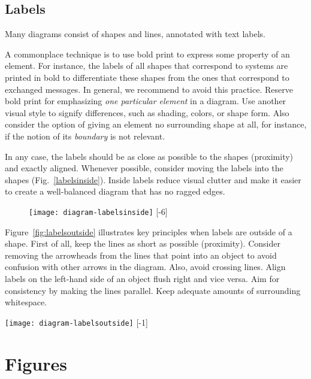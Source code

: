 \subsection{Labels}

Many diagrams consist of shapes and lines, annotated with text labels.

A commonplace technique is to use bold print to express some property of an element. For instance, the labels of all shapes that correspond to systems are printed in bold to differentiate these shapes from the ones that correspond to exchanged  messages. In general, we recommend to avoid this practice. Reserve bold print for emphasizing \emph{one particular element} in a diagram. Use another visual style to signify differences, such as shading, colors, or shape form. Also consider the option of giving an element no surrounding shape at all, for instance, if the notion of its \emph{boundary} is not relevant.

In any case, the labels should be as close as possible to the shapes (proximity) and exactly aligned. Whenever possible, consider moving the labels into the shapes (Fig.~\ref{labelsinside}). Inside labels reduce visual clutter and make it easier to create a well-balanced diagram that has no ragged edges.

\begin{figure}[t]
\centering
\texttt{[image: diagram-labelsinside]}
[-6\baselineskip]
\end{figure}

Figure~\ref{fig:labelsoutside} illustrates key principles when labels are outside of a shape. First of all, keep the lines as short as possible (proximity). Consider removing the arrowheads from the lines that point into an object to avoid confusion with other arrows in the diagram. Also, avoid crossing lines. Align labels on the left-hand side of an object flush right and vice versa. Aim for consistency by making the lines parallel. Keep adequate amounts of surrounding whitespace.

\begin{marginfigure}
\centering
\texttt{[image: diagram-labelsoutside]}
[-1\baselineskip]
\end{marginfigure}

\section{Figures}

















